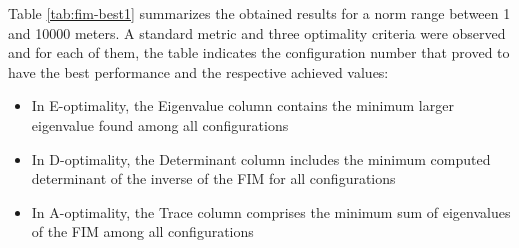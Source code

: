 Table \ref{tab:fim-best1} summarizes the obtained results for a norm range between 1 and 10000 meters. A standard metric and three optimality criteria were observed and for each of them, the table indicates the configuration number that proved to have the best performance and the respective achieved values: 

\begin{itemize}
	\item In E-optimality, the Eigenvalue column contains the minimum larger eigenvalue found among all configurations
	
	\item In D-optimality, the Determinant column includes the minimum computed determinant of the inverse of the FIM for all configurations
	
	\item In A-optimality, the Trace column comprises the minimum sum of eigenvalues of the FIM among all configurations
\end{itemize}

